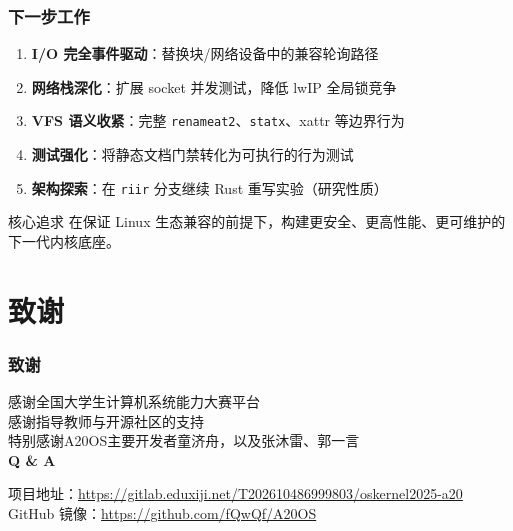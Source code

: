 \documentclass[aspectratio=1610]{beamer}
\newcommand{\code}[1]{\texttt{\footnotesize #1}}
\newcommand{\high}[1]{\textbf{\textcolor{ThemeColor}{#1}}}
\begin{document}
\begin{frame}
    \frametitle{下一步工作}
    \begin{enumerate}
        \item \high{I/O 完全事件驱动}：替换块/网络设备中的兼容轮询路径
        \item \high{网络栈深化}：扩展 socket 并发测试，降低 lwIP 全局锁竞争
        \item \high{VFS 语义收紧}：完整 \code{renameat2}、\code{statx}、xattr 等边界行为
        \item \high{测试强化}：将静态文档门禁转化为可执行的行为测试
        \item \high{架构探索}：在 \code{riir} 分支继续 Rust 重写实验（研究性质）
    \end{enumerate}
    \vspace{0.5em}
    \begin{block}{核心追求}
        在保证 Linux 生态兼容的前提下，构建更安全、更高性能、更可维护的下一代内核底座。
    \end{block}
\end{frame}

\section*{致谢}

\begin{frame}
    \frametitle{致谢}
    \begin{center}
        \vspace{2em}
        {\Large 感谢全国大学生计算机系统能力大赛平台}\\[0.8em]
        {\Large 感谢指导教师与开源社区的支持}\\[0.8em]
        {\large 特别感谢A20OS主要开发者童济舟，以及张沐雷、郭一言}\\[2em]
        \vspace{1em}
        {\Large\high{Q \& A}}
        \vspace{2em}

        \small
        项目地址：\url{https://gitlab.eduxiji.net/T202610486999803/oskernel2025-a20}\\
        GitHub 镜像：\url{https://github.com/fQwQf/A20OS}
    \end{center}
\end{frame}
\end{document}
